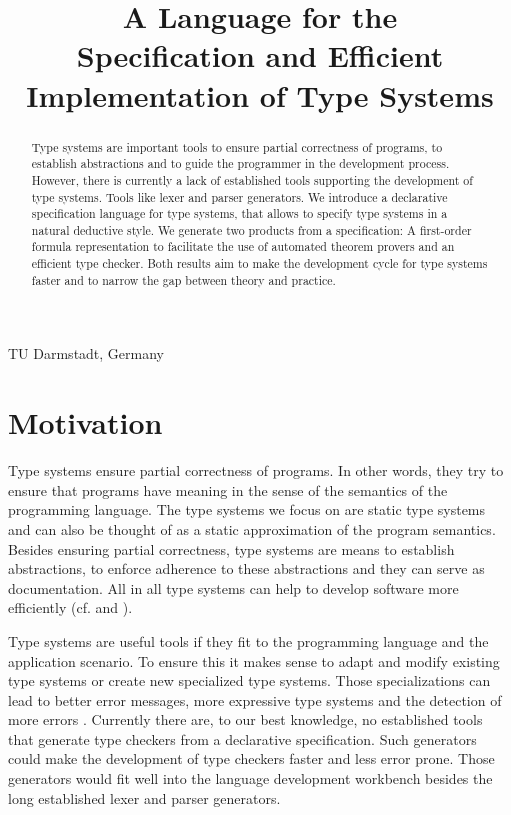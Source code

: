 \documentclass[preprint]{sigplanconf}
\begin{document}
\title{A Language for the \\ Specification and Efficient Implementation
  of Type Systems}

           {TU Darmstadt, Germany}
           {}
\maketitle

\begin{abstract}
  Type systems are important tools to ensure partial correctness of
  programs, to establish abstractions and to guide the programmer in
  the development process. However, there is currently a lack of
  established tools supporting the development of type systems. Tools
  like lexer and parser generators. We introduce a declarative
  specification language for type systems, that allows to specify type
  systems in a natural deductive style. We generate two products from
  a specification: A first-order formula representation to facilitate
  the use of automated theorem provers and an efficient type
  checker. Both results aim to make the development cycle for type
  systems faster and to narrow the gap between theory and practice.
 \end{abstract}

\section{Motivation}
Type systems ensure partial correctness of programs. In other words,
they try to ensure that programs have meaning in the sense of the
semantics of the programming language. The type systems we focus on
are static type systems and can also be thought of as a static
approximation of the program semantics. Besides ensuring partial
correctness, type systems are means to establish abstractions, to
enforce adherence to these abstractions and they can serve as
documentation. All in all type systems can help to develop software
more efficiently (cf. \cite{Petersen:2014:ECS:2597008.2597152} and
\cite{Mayer:2012:ESI:2384616.2384666}).

Type systems are useful tools if they fit to the programming language
and the application scenario. To ensure this it makes sense to adapt
and modify existing type systems or create new specialized type
systems. Those specializations can lead to better error messages, more
expressive type systems and the detection of more errors
\cite{Thiemann02programmabletype}. Currently there are, to our best
knowledge, no established tools that generate type checkers from a
declarative specification. Such generators could make the development
of type checkers faster and less error prone. Those generators would
fit well into the language development workbench besides the long
established lexer and parser generators.
\end{document}
